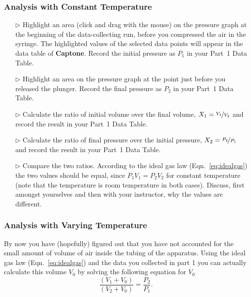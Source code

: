 \subsubsection{Analysis with Constant Temperature}
\begin{itemize}
\item[$\triangleright$] Highlight an area (click and drag with the mouse) on the pressure graph at the beginning of the data-collecting run, before you compressed the air in the syringe. The highlighted values of the selected data points will appear in the data table of \textbf{Captone}. Record the initial pressure as $P_{1}$ in your Part~1 Data Table.
\item[$\triangleright$] Highlight an area on the pressure graph at the point just before you released the plunger. Record the final pressure as $P_{2}$ in your Part~1 Data Table.
\item[$\triangleright$] Calculate the ratio of initial volume over the final volume, $X_{1} = \nicefrac{V_{1}}{V_{2}}$ and record the result in your Part~1 Data Table.
\item[$\triangleright$] Calculate the ratio of final pressure over the initial pressure, $X_{2} = \nicefrac{P_{2}}{P_{1}}$ and record the result in your Part~1 Data Table.
\item[$\triangleright$] Compare the two ratios. According to the ideal gas law (Eqn.~\ref{eq:idealgas}) the two values should be equal, since $P_{1} V_{1} = P_{2} V_{2}$ for constant temperature (note that the temperature is room temperature in both cases). Discuss, first amongst yourselves and then with your instructor, why the values are different.
\end{itemize}

\subsubsection{Analysis with Varying Temperature}

By now you have (hopefully) figured out that you have not accounted for the small amount of volume of air inside the tubing of the apparatus. Using the ideal gas law (Eqn.~\ref{eq:idealgas}) and the data you collected in part 1 you can actually calculate this volume $V_{0}$ by solving the following equation for $V_{0}$
\begin{equation}
  \frac{(V_{1} + V_{0})}{(V_{2} + V_{0})} = \frac{P_{2}}{P_{1}}.
\end{equation}

